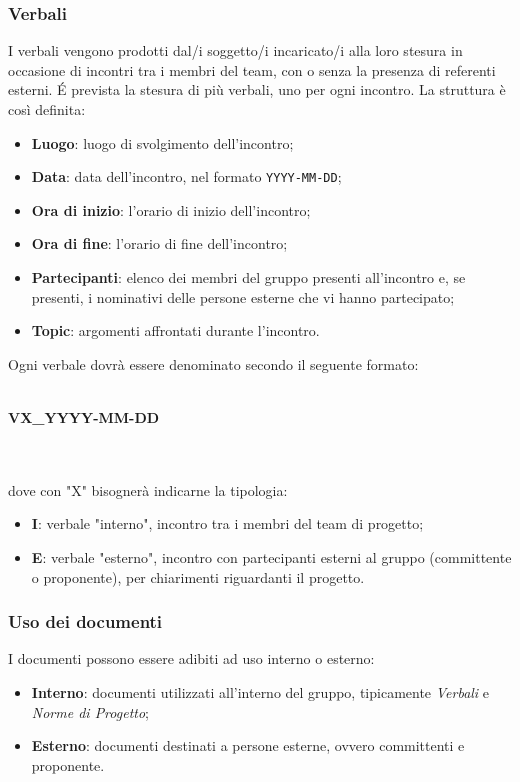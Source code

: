 \subsubsection{Verbali}
I verbali vengono prodotti dal/i soggetto/i incaricato/i alla loro stesura in occasione di incontri tra i membri del team, con o senza la presenza di referenti esterni. \'E prevista la stesura di più verbali, uno per ogni incontro.
La struttura è così definita: \begin{itemize}
\item \textbf{Luogo}: luogo di svolgimento dell'incontro;
\item \textbf{Data}: data dell'incontro, nel formato \texttt{YYYY-MM-DD};
\item \textbf{Ora di inizio}: l'orario di inizio dell'incontro;
\item \textbf{Ora di fine}: l'orario di fine dell'incontro;
\item \textbf{Partecipanti}: elenco dei membri del gruppo presenti all'incontro e, se presenti, i nominativi delle persone esterne che vi hanno partecipato;
\item \textbf{Topic}: argomenti affrontati durante l'incontro.
\end{itemize}
Ogni verbale dovrà essere denominato secondo il seguente formato: \\ \\
\centerline{\textbf{VX\_YYYY-MM-DD}} \\ \\
dove con "X" bisognerà indicarne la tipologia: \begin{itemize}
\item \textbf{I}: verbale "interno", incontro tra i membri del team di progetto;
\item \textbf{E}: verbale "esterno", incontro con partecipanti esterni al gruppo (committente o proponente), per chiarimenti riguardanti il progetto.
\end{itemize}

\subsubsection{Uso dei documenti}
I documenti possono essere adibiti ad uso interno o esterno:
\begin{itemize}
\item \textbf{Interno}: documenti utilizzati all'interno del gruppo, tipicamente \textit{Verbali} e \textit{Norme di Progetto};
\item \textbf{Esterno}: documenti destinati a persone esterne, ovvero committenti e proponente.
\end{itemize}

